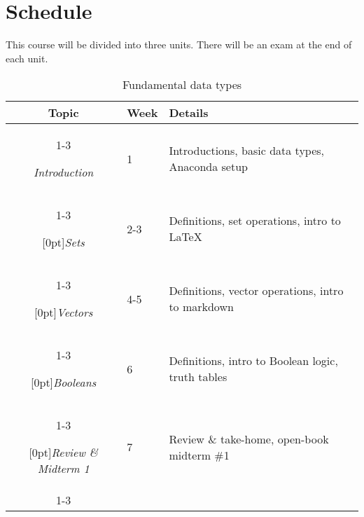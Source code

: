 \documentclass[10pt]{memoir}
\begin{document}
\section{\textbf{Schedule}}

This course will be divided into three units. There will be an exam at the end of each unit. \\

\begin{table}[htb!]
\centering
\begin{tabular}{cll}
    \textbf{Topic} & \textbf{Week} &  \textbf{Details} \\
    \cmidrule[.1em](lr){1-3}
    
    \textit{Introduction} & 1 & Introductions, basic data types, Anaconda setup \\
    \cmidrule[.1em](lr){1-3} 
 
     \multirow{1}{*}[0pt]{\textit{Sets}} %
        & 2-3 &  Definitions, set operations, intro to \LaTeX \\ 
        \cmidrule[.1em](lr){1-3}
        
    \multirow{1}{*}[0pt]{\textit{Vectors}} %
        & 4-5 & Definitions, vector operations, intro to markdown \\ \cmidrule[.1em](lr){1-3}

    \multirow{1}{*}[0pt]{\textit{Booleans}} %
        & 6 & Definitions, intro to Boolean logic, truth tables \\   \cmidrule[.1em](lr){1-3}    

   \multirow{1}{*}[0pt]{\textit{Review \& Midterm 1}} %
        & 7 & Review \& take-home, open-book midterm \#1 \\ \cmidrule[.1em](lr){1-3}             

\end{tabular}\\
\caption{Fundamental data types}
\end{table}

\end{document}
